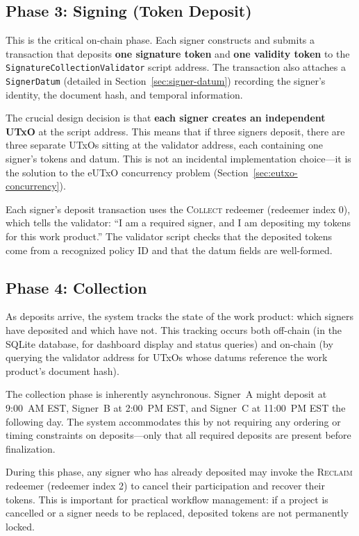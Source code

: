 \subsection{Phase 3: Signing (Token Deposit)}

This is the critical on-chain phase.  Each signer constructs and submits a
transaction that deposits \textbf{one signature token} and \textbf{one
validity token} to the \texttt{SignatureCollectionValidator} script address.
The transaction also attaches a \texttt{SignerDatum} (detailed in
Section~\ref{sec:signer-datum}) recording the signer's identity, the
document hash, and temporal information.

The crucial design decision is that \textbf{each signer creates an
independent UTxO} at the script address.  This means that if three signers
deposit, there are three separate UTxOs sitting at the validator address,
each containing one signer's tokens and datum.  This is not an incidental
implementation choice---it is the solution to the eUTxO concurrency
problem (Section~\ref{sec:eutxo-concurrency}).

Each signer's deposit transaction uses the \textsc{Collect} redeemer
(redeemer index 0), which tells the validator: ``I am a required signer,
and I am depositing my tokens for this work product.''  The validator script
checks that the deposited tokens come from a recognized policy ID and that
the datum fields are well-formed.

\subsection{Phase 4: Collection}

As deposits arrive, the system tracks the state of the work product: which
signers have deposited and which have not.  This tracking occurs both
off-chain (in the SQLite database, for dashboard display and status queries)
and on-chain (by querying the validator address for UTxOs whose datums
reference the work product's document hash).

The collection phase is inherently asynchronous.  Signer~A might deposit at
9:00~AM EST, Signer~B at 2:00~PM EST, and Signer~C at 11:00~PM EST the
following day.  The system accommodates this by not requiring any ordering
or timing constraints on deposits---only that all required deposits are
present before finalization.

During this phase, any signer who has already deposited may invoke the
\textsc{Reclaim} redeemer (redeemer index 2) to cancel their participation
and recover their tokens.  This is important for practical workflow
management: if a project is cancelled or a signer needs to be replaced,
deposited tokens are not permanently locked.

